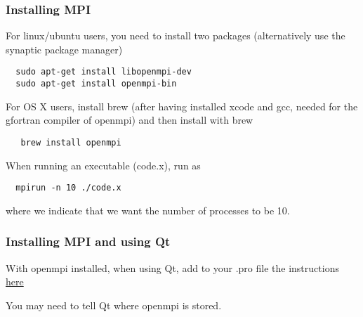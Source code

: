 \documentclass{beamer}
\begin{document}
\begin{frame}
\frametitle{Installing MPI}

\begin{block}{}
For linux/ubuntu users, you need to install two packages (alternatively use the synaptic package manager)



\begin{verbatim}
  sudo apt-get install libopenmpi-dev
  sudo apt-get install openmpi-bin

\end{verbatim}

For OS X users, install brew (after having installed xcode and gcc, needed for the 
gfortran compiler of openmpi) and then install with brew


\begin{verbatim}
   brew install openmpi

\end{verbatim}

When running an executable (code.x), run as


\begin{verbatim}
  mpirun -n 10 ./code.x

\end{verbatim}

where we indicate that we want  the number of processes to be 10.

\end{block}
\end{frame}

\begin{frame}
\frametitle{Installing MPI and using Qt}

\begin{block}{}
With openmpi installed, when using Qt, add to your .pro file the instructions \href{{http://dragly.org/2012/03/14/developing-mpi-applications-in-qt-creator/}}{here}

You may need to tell Qt where openmpi is stored.

\end{block}
\end{frame}
\end{document}
